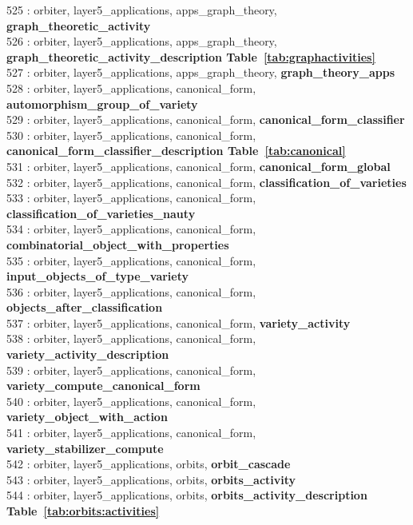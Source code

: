 525 : orbiter, layer5\_applications, apps\_graph\_theory, {\bf graph\_theoretic\_activity}\\
526 : orbiter, layer5\_applications, apps\_graph\_theory, {\bf graph\_theoretic\_activity\_description Table~\ref{tab:graphactivities}}\\
527 : orbiter, layer5\_applications, apps\_graph\_theory, {\bf graph\_theory\_apps}\\
528 : orbiter, layer5\_applications, canonical\_form, {\bf automorphism\_group\_of\_variety}\\
529 : orbiter, layer5\_applications, canonical\_form, {\bf canonical\_form\_classifier}\\
530 : orbiter, layer5\_applications, canonical\_form, {\bf canonical\_form\_classifier\_description Table~\ref{tab:canonical}}\\
531 : orbiter, layer5\_applications, canonical\_form, {\bf canonical\_form\_global}\\
532 : orbiter, layer5\_applications, canonical\_form, {\bf classification\_of\_varieties}\\
533 : orbiter, layer5\_applications, canonical\_form, {\bf classification\_of\_varieties\_nauty}\\
534 : orbiter, layer5\_applications, canonical\_form, {\bf combinatorial\_object\_with\_properties}\\
535 : orbiter, layer5\_applications, canonical\_form, {\bf input\_objects\_of\_type\_variety}\\
536 : orbiter, layer5\_applications, canonical\_form, {\bf objects\_after\_classification}\\
537 : orbiter, layer5\_applications, canonical\_form, {\bf variety\_activity}\\
538 : orbiter, layer5\_applications, canonical\_form, {\bf variety\_activity\_description}\\
539 : orbiter, layer5\_applications, canonical\_form, {\bf variety\_compute\_canonical\_form}\\
540 : orbiter, layer5\_applications, canonical\_form, {\bf variety\_object\_with\_action}\\
541 : orbiter, layer5\_applications, canonical\_form, {\bf variety\_stabilizer\_compute}\\
542 : orbiter, layer5\_applications, orbits, {\bf orbit\_cascade}\\
543 : orbiter, layer5\_applications, orbits, {\bf orbits\_activity}\\
544 : orbiter, layer5\_applications, orbits, {\bf orbits\_activity\_description Table~\ref{tab:orbits:activities}}\\
